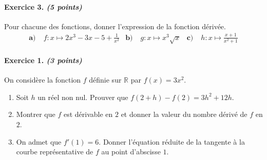 \documentclass[11pt]{article}
\begin{document}
\paragraph{Exercice 3. \emph{(5 points)}}
Pour chacune des fonctions, donner l'expression de la fonction
dérivée.
\begin{align*}
  \textbf{a)}\; & f:x\mapsto 2x^3-3x-5+\frac{1}{x^2} &
  \textbf{b)}\; & g:x\mapsto x^3\sqrt x &
  \textbf{c)}\; & h:x\mapsto \frac{x+1}{x^2+1} 
\end{align*}
\vspace{1.5cm}
\paragraph{Exercice 1. \emph{(3 points)}} On considère la fonction $f$ définie sur $\mathbb{R}$
par $f(x)=3x^2$.
\begin{enumerate}
  \item Soit $h$ un réel non nul. Prouver que $f(2+h)-f(2)=3h^2+12h$.
  \item Montrer que $f$ est dérivable en $2$ et donner la valeur du nombre
    dérivé de $f$ en $2$.
  \item On admet que $f'(1)=6$. Donner l'équation réduite de la tangente à la
    courbe représentative de $f$ au point d'abscisse $1$.
\end{enumerate}
\end{document}
